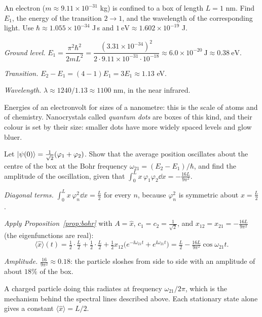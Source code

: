 \begin{example}\label{ex:nano-box}
  An electron ($m\approx9.11\times10^{-31}$ kg) is confined to a box of length $L=1$ nm. Find $E_1$, the energy of the transition $2\to1$, and the wavelength of the corresponding light. Use $\hbar\approx1.055\times10^{-34}$ J\,s and $1\ \mathrm{eV}\approx1.602\times10^{-19}$ J.
\end{example}
\begin{solution}
  \begin{steps}
    \item \emph{Ground level.} $E_1=\dfrac{\pi^2\hbar^2}{2mL^2}=\dfrac{(3.31\times10^{-34})^2}{2\cdot9.11\times10^{-31}\cdot10^{-18}}\approx6.0\times10^{-20}\ \mathrm J\approx0.38\ \mathrm{eV}$.
    \item \emph{Transition.} $E_2-E_1=(4-1)E_1=3E_1\approx1.13$ eV.
    \item \emph{Wavelength.} $\lambda\approx1240/1.13\approx1100$ nm, in the near infrared.
  \end{steps}
  Energies of an electronvolt for sizes of a nanometre: this is the scale of atoms and of chemistry. Nanocrystals called \emph{quantum dots} are boxes of this kind, and their colour is set by their size: smaller dots have more widely spaced levels and glow bluer.
\end{solution}

\begin{example}\label{ex:box-moves}
  Let $\left|\psi(0)\right\rangle=\tfrac1{\sqrt2}(\varphi_1+\varphi_2)$. Show that the average position oscillates about the centre of the box at the Bohr frequency $\omega_{21}=(E_2-E_1)/\hbar$, and find the amplitude of the oscillation, given that $\int_0^Lx\,\varphi_1\varphi_2\dd x=-\tfrac{16L}{9\pi^2}$.
\end{example}
\begin{solution}
  \begin{steps}
    \item \emph{Diagonal terms.} $\int_0^Lx\,\varphi_n^2\dd x=\tfrac L2$ for every $n$, because $\varphi_n^2$ is symmetric about $x=\tfrac L2$.
    \item \emph{Apply Proposition~\ref{prop:bohr}} with $A=\hat x$, $c_1=c_2=\tfrac1{\sqrt2}$, and $x_{12}=x_{21}=-\tfrac{16L}{9\pi^2}$ (the eigenfunctions are real):
      \[
        \langle\hat x\rangle(t)=\tfrac12\cdot\tfrac L2+\tfrac12\cdot\tfrac L2+\tfrac12x_{12}\bigl(e^{-\ii\omega_{21}t}+e^{\ii\omega_{21}t}\bigr)=\tfrac L2-\tfrac{16L}{9\pi^2}\cos\omega_{21}t .
      \]
    \item \emph{Amplitude.} $\tfrac{16}{9\pi^2}\approx0.18$: the particle sloshes from side to side with an amplitude of about $18\%$ of the box.
  \end{steps}
  A charged particle doing this radiates at frequency $\omega_{21}/2\pi$, which is the mechanism behind the spectral lines described above. Each stationary state alone gives a constant $\langle\hat x\rangle=L/2$.
\end{solution}

